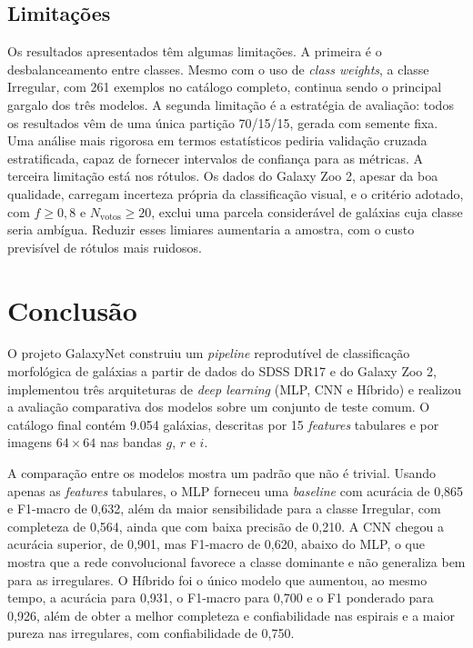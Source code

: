 \documentclass[12pt, a4paper]{article}
\begin{document}
\subsection{Limitações}

Os resultados apresentados têm algumas limitações. A primeira é o
desbalanceamento entre classes. Mesmo com o uso de \textit{class
weights}, a classe Irregular, com 261 exemplos no catálogo completo,
continua sendo o principal gargalo dos três modelos. A segunda
limitação é a estratégia de avaliação: todos os resultados vêm de uma
única partição 70/15/15, gerada com semente fixa. Uma análise mais
rigorosa em termos estatísticos pediria validação cruzada
estratificada, capaz de fornecer intervalos de confiança para as
métricas. A terceira limitação está nos rótulos. Os dados do Galaxy
Zoo 2, apesar da boa qualidade, carregam incerteza própria da
classificação visual, e o critério adotado, com $f \geq 0{,}8$ e
$N_\text{votos} \geq 20$, exclui uma parcela considerável de galáxias
cuja classe seria ambígua. Reduzir esses limiares aumentaria a
amostra, com o custo previsível de rótulos mais ruidosos.

\section{Conclusão}

O projeto GalaxyNet construiu um \textit{pipeline} reprodutível de
classificação morfológica de galáxias a partir de dados do SDSS DR17 e do
Galaxy Zoo 2, implementou três arquiteturas de \textit{deep learning}
(MLP, CNN e Híbrido) e realizou a avaliação comparativa dos modelos
sobre um conjunto de teste comum. O catálogo final contém 9.054 galáxias,
descritas por 15 \textit{features} tabulares e por imagens $64 \times 64$
nas bandas $g$, $r$ e $i$.

A comparação entre os modelos mostra um padrão que não é trivial.
Usando apenas as \textit{features} tabulares, o MLP forneceu uma
\textit{baseline} com acurácia de 0,865 e F1-macro de 0,632, além da
maior sensibilidade para a classe Irregular, com completeza de 0,564,
ainda que com baixa precisão de 0,210. A CNN chegou a acurácia
superior, de 0,901, mas F1-macro de 0,620, abaixo do MLP, o que
mostra que a rede convolucional favorece a classe dominante e não
generaliza bem para as irregulares. O Híbrido foi o único modelo que
aumentou, ao mesmo tempo, a acurácia para 0,931, o F1-macro para
0,700 e o F1 ponderado para 0,926, além de obter a melhor completeza
e confiabilidade nas espirais e a maior pureza nas irregulares, com
confiabilidade de 0,750.
\end{document}
